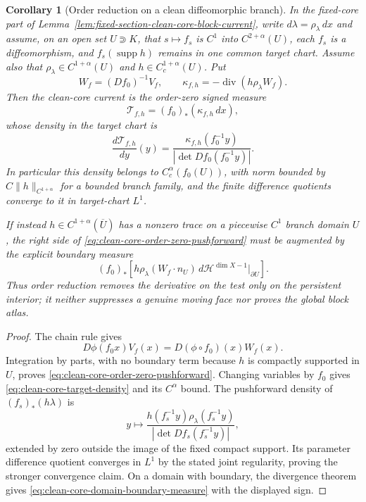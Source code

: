 \documentclass[11pt]{article}
\newtheorem{corollary}[theorem]{Corollary}
\begin{document}
\begin{corollary}[Order reduction on a clean diffeomorphic branch]
\label{cor:clean-core-order-zero}
In the fixed-core part of
Lemma~\ref{lem:fixed-section-clean-core-block-current}, write
$d\lambda=\rho_\lambda\,dx$ and assume, on an open set
$U\Supset K$, that $s\mapsto f_s$ is $C^1$ into
$C^{2+\alpha}(U)$, each $f_s$ is a diffeomorphism, and
$f_s(\operatorname{supp}h)$ remains in one common target chart.  Assume
also that $\rho_\lambda\in C^{1+\alpha}(U)$ and
$h\in C_c^{1+\alpha}(U)$.  Put
\begin{equation}
\label{eq:clean-core-order-zero-density}
 W_f=(Df_0)^{-1}V_f,\qquad
 \kappa_{f,h}=-\operatorname{div}
       (h\rho_\lambda W_f).
\end{equation}
Then the clean-core current is the order-zero signed measure
\begin{equation}
\label{eq:clean-core-order-zero-pushforward}
 \mathcal T_{f,h}=(f_0)_*(\kappa_{f,h}\,dx),
\end{equation}
whose density in the target chart is
\begin{equation}
\label{eq:clean-core-target-density}
 \frac{d\mathcal T_{f,h}}{dy}(y)
 =\frac{\kappa_{f,h}(f_0^{-1}y)}
        {|\det Df_0(f_0^{-1}y)|}.
\end{equation}
In particular this density belongs to $C^\alpha_c(f_0(U))$, with norm
bounded by $C\|h\|_{C^{1+\alpha}}$ for a bounded branch family, and the
finite difference quotients converge to it in target-chart $L^1$.

If instead $h\in C^{1+\alpha}(\overline U)$ has a nonzero trace on a
piecewise $C^1$ branch domain $U$, the right side of
\eqref{eq:clean-core-order-zero-pushforward} must be
augmented by the explicit boundary measure
\begin{equation}
\label{eq:clean-core-domain-boundary-measure}
 (f_0)_*\!\left[
 h\rho_\lambda(W_f\cdot n_U)\,
 d\mathcal H^{\dim X-1}\big|_{\partial U}\right].
\end{equation}
Thus order reduction removes the derivative on the test only on the
persistent interior; it neither suppresses a genuine moving face nor proves
the global block atlas.
\end{corollary}

\begin{proof}
The chain rule gives
\[
 D\phi(f_0x)V_f(x)
 =D(\phi\circ f_0)(x)W_f(x).
\]
Integration by parts, with no boundary term because $h$ is compactly
supported in $U$, proves \eqref{eq:clean-core-order-zero-pushforward}.
Changing variables by $f_0$ gives
\eqref{eq:clean-core-target-density} and its $C^\alpha$ bound.  The
pushforward density of $(f_s)_*(h\lambda)$ is
\[
 y\longmapsto
 \frac{h(f_s^{-1}y)\rho_\lambda(f_s^{-1}y)}
      {|\det Df_s(f_s^{-1}y)|},
\]
extended by zero outside the image of the fixed compact support.  Its
parameter difference quotient converges in $L^1$ by the stated joint
regularity, proving the stronger convergence claim.  On a domain with
boundary, the divergence theorem gives
\eqref{eq:clean-core-domain-boundary-measure} with the displayed sign.
\end{proof}
\end{document}

